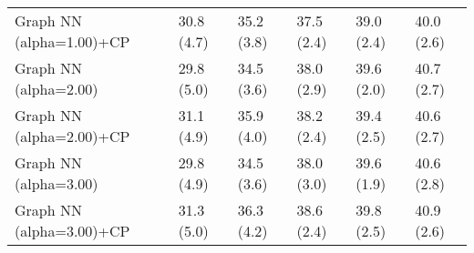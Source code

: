 \documentclass{article}
\begin{document}
\begin{table*}[t!]
\begin{center}
\begin{small}
\begin{sc}
\begin{tabular}{llllll}
Graph NN (alpha=1.00)+CP&30.8 (4.7)      &35.2 (3.8)      &37.5 (2.4)      &39.0 (2.4)      &40.0 (2.6)      \\
Graph NN (alpha=2.00)&29.8 (5.0)      &34.5 (3.6)      &38.0 (2.9)      &39.6 (2.0)      &40.7 (2.7)      \\
Graph NN (alpha=2.00)+CP&31.1 (4.9)      &35.9 (4.0)      &38.2 (2.4)      &39.4 (2.5)      &40.6 (2.7)      \\
Graph NN (alpha=3.00)&29.8 (4.9)      &34.5 (3.6)      &38.0 (3.0)      &39.6 (1.9)      &40.6 (2.8)      \\
Graph NN (alpha=3.00)+CP&31.3 (5.0)      &36.3 (4.2)      &38.6 (2.4)      &39.8 (2.5)      &40.9 (2.6)      \\
\bottomrule
\end{tabular}
\end{sc}
\end{small}
\end{center}
\vskip -0.1in
\end{table*}
\end{document}
